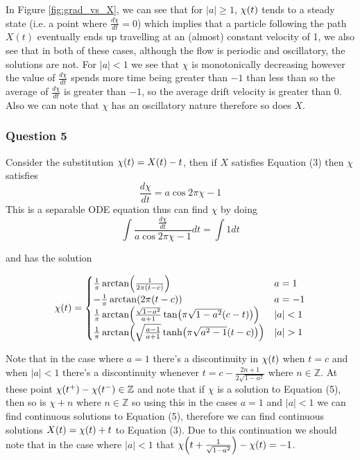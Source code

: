 \documentclass[11pt]{article} %
\let\originalleft\left
\let\originalright\right
\renewcommand{\left}{\mathopen{}\mathclose\bgroup\originalleft}
\renewcommand{\right}{\aftergroup\egroup\originalright}
\begin{document}
In Figure \ref{fig:grad_vs_X}, we can see that for $|a| \geq 1$, $\chi\left(t\right)$ tends to a steady state (i.e. a point where $\frac{d\chi}{dt}=0$) which implies that a particle following the path $X(t)$ eventually ends up travelling at an (almost) constant velocity of 1, we also see that in both of these cases, although the flow is periodic and oscillatory, the solutions are not. For $|a|<1$ we see that $\chi$ is monotonically decreasing however the value of $\frac{d\chi}{dt}$ spends more time being greater than $-1$ than less than so the average of $\frac{d\chi}{dt}$ is greater than $-1$, so the average drift velocity is greater than 0. Also we can note that $\chi$ has an oscillatory nature therefore so does $X$.


\subsubsection*{Question 5}

Consider the substitution $\chi\left( t \right) = X \left( t \right) - t$, then if $X$ satisfies Equation (3) then $\chi$ satisfies
\begin{equation}
	\frac{d\chi}{dt} = a \cos 2\pi\chi - 1
\end{equation}
This is a separable ODE equation thus can find $\chi$ by doing
\begin{equation*}
	\int{\frac{\frac{d\chi}{dt}}{a\cos 2\pi\chi -1}dt} = \int{1dt}
\end{equation*}

and has the solution

\begin{equation*}
	\chi \left(t\right)=
	\begin{cases} 
      		\frac{1}{\pi}\arctan\left(\frac{1}{2\pi\left(t-c\right)}\right)  & a = 1 \\
      		-\frac{1}{\pi}\arctan\left(2\pi\left(t-c\right)\right) & a = -1 \\
      		\frac{1}{\pi}\arctan\left(\frac{\sqrt{1-a^2}}{a+1}\tan\left(\pi\sqrt{1-a^2}\left(c-t\right)\right)\right) & |a| < 1 \\
     		\frac{1}{\pi}\arctan\left(\sqrt{\frac{a-1}{a+1}}\tanh\left(\pi\sqrt{a^2-1}\left(t-c\right)\right)\right) & |a|>1
   	\end{cases}
\end{equation*}

Note that in the case where $a=1$ there's a discontinuity in $\chi\left(t\right)$ when $t=c$ and when $|a|<1$ there's a discontinuity whenever $t=c-\frac{2n+1}{2\sqrt{1-a^2}}$  where $n \in \mathbb{Z}$. At these point $\chi\left(t^+\right)-\chi\left(t^-\right) \in \mathbb{Z}$ and note that if $\chi$ is a solution to Equation (5), then so is $\chi+n$ where $n \in \mathbb{Z}$ so using this in the cases $a=1$ and $|a|<1$ we can find continuous solutions to Equation (5), therefore we can find continuous solutions $X \left( t \right) = \chi \left( t \right) + t$ to Equation (3). Due to this continuation we should note that in the case where $|a|<1$ that $\chi\left(t+\frac{1}{\sqrt{1-a^2}}\right)-\chi\left(t\right) = -1$.
\end{document}
